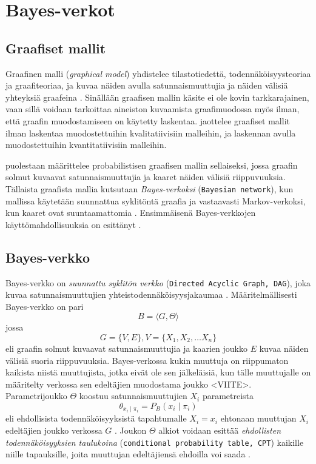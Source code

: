\chapter{Bayes-verkot\label{bayes}}

\section{Graafiset mallit}
Graafinen malli (\emph{graphical model}) yhdistelee tilastotiedettä, todennäköisyysteoriaa ja graafiteoriaa, ja kuvaa näiden avulla satunnaismuuttujia ja näiden välisiä yhteyksiä graafeina \citep{jordan_graphical_2004}. Sinällään graafisen mallin käsite ei ole kovin tarkkarajainen, vaan sillä voidaan tarkoittaa aineiston kuvaamista graafimuodossa myös ilman, että graafin muodostamiseen on käytetty laskentaa. \citet{ramsahai_connecting_2020} jaottelee graafiset mallit ilman laskentaa muodostettuihin kvalitatiivisiin malleihin, ja laskennan avulla muodostettuihin kvantitatiivisiin malleihin. 

\citet{jordan_graphical_2004} puolestaan määrittelee probabilistisen graafisen mallin sellaiseksi, jossa graafin solmut kuvaavat satunnaismuuttujia ja kaaret näiden välisiä riippuvuuksia. Tällaista graafista mallia kutsutaan \emph{Bayes-verkoksi} (\texttt{Bayesian network}), kun mallissa käytetään suunnattua syklitöntä graafia ja vastaavasti Markov-verkoksi, kun kaaret ovat suuntaamattomia \citep{ruggeri_bayesian_2008}. Ensimmäisenä Bayes-verkkojen käyttömahdollisuuksia on esittänyt \citet{pearl_fusion_1986}.

\section{Bayes-verkko}
Bayes-verkko on \emph{suunnattu syklitön verkko} (\texttt{Directed Acyclic Graph, DAG}), joka kuvaa satunnaismuuttujien yhteistodennäköisyysjakaumaa \citep{ruggeri_bayesian_2008}. Määritelmällisesti Bayes-verkko on pari 
$$
    B = \langle G, \Theta \rangle
$$
jossa 
$$
    G = \{V, E\}, V = \{X_1, X_2,\ldots X_n\}
$$ 
eli graafin solmut kuvaavat satunnaismuuttujia ja kaarien joukko $E$ kuvaa näiden välisiä suoria riippuvuuksia. Bayes-verkossa kukin muuttuja on riippumaton kaikista niistä muuttujista, jotka eivät ole sen jälkeläisiä, kun tälle muuttujalle on määritelty verkossa sen edeltäjien muodostama joukko <VIITE>. Parametrijoukko $\Theta$ koostuu satunnaismuuttujien $X_i$ parametreista 
$$
    \theta_{x_i \mid \pi_i} = P_B(x_i \mid \pi_i)
$$ 
eli ehdollisista todennäköisyyksistä tapahtumalle $X_i = x_i$ ehtonaan muuttujan $X_i$ edeltäjien joukko verkossa $G$ \citep{ruggeri_bayesian_2008, myllymaki_bayes-verkkojen_1998}. Joukon $\Theta$ alkiot voidaan esittää \emph{ehdollisten todennäköisyyksien taulukoina}  (\texttt{conditional probability table, CPT}) kaikille niille tapauksille, joita muuttujan edeltäjiensä ehdoilla voi saada \citep{zhang_brief_2019}.

